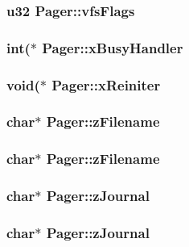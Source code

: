 \subsubsection{\setlength{\rightskip}{0pt plus 5cm}\bf{u32} \bf{Pager::vfs\-Flags}}\label{structPager_4756a20185d4d5903d35554c353d4e88}


\subsubsection{\setlength{\rightskip}{0pt plus 5cm}int($\ast$ \bf{Pager::x\-Busy\-Handler}}\label{structPager_97421404c7f36afbf1b66725bc6101ad}


\subsubsection{\setlength{\rightskip}{0pt plus 5cm}void($\ast$ \bf{Pager::x\-Reiniter}}\label{structPager_7c1010be8e470c11e88033fa163fbdba}


\subsubsection{\setlength{\rightskip}{0pt plus 5cm}char$\ast$ \bf{Pager::z\-Filename}}\label{structPager_a648755def4a5b1f683c62d6b00fda7d}


\subsubsection{\setlength{\rightskip}{0pt plus 5cm}char$\ast$ \bf{Pager::z\-Filename}}\label{structPager_a648755def4a5b1f683c62d6b00fda7d}


\subsubsection{\setlength{\rightskip}{0pt plus 5cm}char$\ast$ \bf{Pager::z\-Journal}}\label{structPager_773dda603ace878a33d288337a5707f3}


\subsubsection{\setlength{\rightskip}{0pt plus 5cm}char$\ast$ \bf{Pager::z\-Journal}}\label{structPager_773dda603ace878a33d288337a5707f3}


